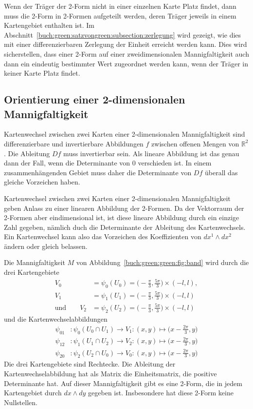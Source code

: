 Wenn der Träger der 2-Form nicht in einer einzelnen Karte Platz
findet, dann muss die 2-Form in 2-Formen aufgeteilt werden, deren
Träger jeweils in einem Kartengebiet enthalten ist.
Im Abschnitt~\ref{buch:green:satzvongreen:subsection:zerlegung}
wird gezeigt, wie dies mit einer differenzierbaren Zerlegung
der Einheit erreicht werden kann.
Dies wird sicherstellen, dass einer 2-Form auf einer
zweidimensionalen Mannigfaltigkeit auch dann ein eindeutig bestimmter
Wert zugeordnet werden kann, wenn der Träger in keiner Karte Platz
findet.

%
%
\subsection{Orientierung einer 2-dimensionalen Mannigfaltigkeit}
Kartenwechsel zwischen zwei Karten einer 2-dimensionalen
Mannigfaltigkeit sind differenzierbare und invertierbare Abbildungen
$f$ zwischen offenen Mengen von $\mathbb{R}^2$.
Die Ableitung $Df$ muss invertierbar sein.
Als lineare Abbildung ist das genau dann der Fall, wenn die Determinante
von $0$ verschieden ist.
In einem zusammenhängenden Gebiet muss daher die Determinante
von $Df$ überall das gleiche Vorzeichen haben.

Kartenwechsel zwischen zwei Karten einer 2-dimensionalen Mannigfaltigkeit
geben Anlass zu einer linearen Abbildung der 2-Formen.
Da der Vektorraum der 2-Formen aber eindimensional ist, ist diese
lineare Abbildung durch ein einzige Zahl gegeben, nämlich duch die
Determinante der Ableitung des Kartenwechsels.
Ein Kartenwechsel kann also das Vorzeichen des Koeffizienten
von $dx^1\wedge dx^2$ ändern oder gleich belassen.

\begin{beispiel}
\label{buch:green:green:beispiel:band}

Die Mannigfaltigkeit $M$ von Abbildung~\ref{buch:green:green:fig:band}
wird durch die drei Kartengebiete
\begin{align*}
V_0&=\psi_0(U_0) = \biggl(-\frac{\pi}3,\frac{5\pi}3\biggr)\times(-l,l),
\\
V_1&=\psi_1(U_1) = \biggl(-\frac{\pi}3,\frac{5\pi}3\biggr)\times(-l,l)
\\
\text{und}\qquad
V_2&=\psi_2(U_2) = \biggl(-\frac{\pi}3,\frac{5\pi}3\biggr)\times(-l,l)
\end{align*}
und die Kartenwechselabbildungen
\begin{align*}
\psi_{01}&\colon
\psi_0(U_0\cap U_1)
\to
V_1
:(x,y) \mapsto \biggl(x-\frac{2\pi}3,y\biggr)
\\
\psi_{12}&\colon
\psi_1(U_1\cap U_2)
\to
V_2
:(x,y) \mapsto \biggl(x-\frac{2\pi}3,y\biggr)
\\
\psi_{20}&\colon
\psi_2(U_2\cap U_0)
\to
V_0
:(x,y) \mapsto \biggl(x-\frac{2\pi}3,y\biggr)
\end{align*}
Die drei Kartengebiete sind Rechtecke.
Die Ableitung der Kartenwechselabbildung hat als Matrix die Einheitsmatrix,
die positive Determinante hat.
Auf dieser Mannigfaltigkeit gibt es eine 2-Form, die in jedem 
Kartengebiet durch $dx\wedge dy$ gegeben ist.
Insbesondere hat diese 2-Form keine Nullstellen.
\end{beispiel}


